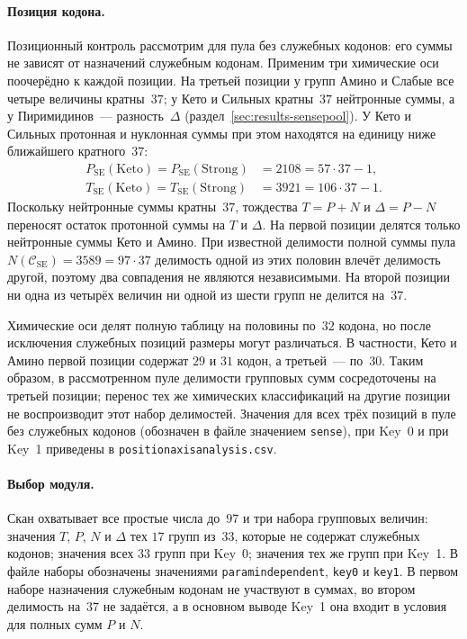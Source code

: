 \documentclass[11pt,a4paper]{article}
\renewcommand{\_}{\origunderscore\allowbreak}
\begin{document}
\paragraph{Позиция кодона.}
Позиционный контроль рассмотрим для пула без служебных
кодонов: его суммы не зависят от назначений служебным кодонам.
Применим три химические оси поочерёдно к каждой позиции.
На третьей позиции
у групп Амино и Слабые все четыре величины кратны~$37$;
у Кето и Сильных кратны~$37$ нейтронные суммы,
а у Пиримидинов~--- разность~$\Delta$
(раздел~\ref{sec:results-sensepool}).
У Кето и Сильных протонная и нуклонная суммы при этом
находятся на единицу ниже ближайшего кратного~$37$:
\[
\begin{aligned}
P_{\mathrm{SE}}(\mathrm{Keto})
  = P_{\mathrm{SE}}(\mathrm{Strong}) &= 2108=57\cdot37-1,\\
T_{\mathrm{SE}}(\mathrm{Keto})
  = T_{\mathrm{SE}}(\mathrm{Strong}) &= 3921=106\cdot37-1.
\end{aligned}
\]
Поскольку нейтронные суммы кратны~$37$, тождества
$T=P+N$ и $\Delta=P-N$ переносят остаток протонной суммы
на $T$ и $\Delta$.
На первой позиции
делятся только нейтронные суммы Кето и Амино.
При известной делимости полной суммы пула
$N(\mathcal C_{\mathrm{SE}})=3589=97\cdot37$
делимость одной из этих половин влечёт делимость другой,
поэтому два совпадения не являются независимыми.
На второй позиции ни одна из четырёх величин
ни одной из шести групп не делится на~$37$.

Химические оси делят полную таблицу на половины по~$32$
кодона, но после исключения служебных позиций размеры
могут различаться. В частности, Кето и Амино первой позиции
содержат $29$ и $31$ кодон, а третьей~--- по~$30$.
Таким образом, в рассмотренном пуле делимости групповых
сумм сосредоточены на третьей позиции; перенос тех же
химических классификаций на другие позиции не воспроизводит
этот набор делимостей. Значения для всех трёх позиций
в пуле без служебных кодонов (обозначен в файле
значением \texttt{sense}), при Key~0 и при Key~1
приведены в \texttt{position\_axis\_analysis.csv}.

\paragraph{Выбор модуля.}
Скан охватывает все простые числа до~$97$ и три набора
групповых величин: значения $T$, $P$, $N$ и $\Delta$
тех $17$ групп из~$33$, которые не содержат служебных
кодонов; значения всех $33$ групп при Key~0; значения
тех же групп при Key~1. В файле наборы обозначены
значениями \texttt{param\_independent}, \texttt{key0}
и \texttt{key1}.
В первом наборе назначения служебным кодонам не участвуют
в суммах, во втором
делимость на~$37$ не задаётся, а в основном выводе
Key~1 она входит в условия для полных сумм $P$ и $N$.
\end{document}

